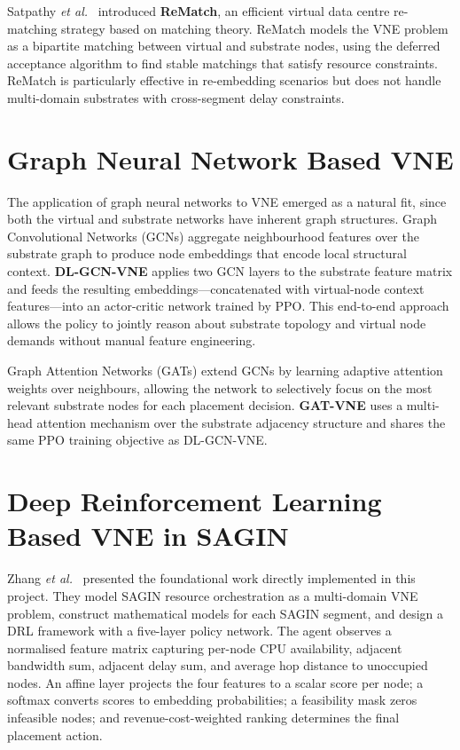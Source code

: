 \documentclass[12pt,a4paper]{report}
\begin{document}
Satpathy \textit{et al.}\ \cite{satpathy2022rematch} introduced \textbf{ReMatch}, an efficient
virtual data centre re-matching strategy based on matching theory. ReMatch models the VNE
problem as a bipartite matching between virtual and substrate nodes, using the deferred
acceptance algorithm to find stable matchings that satisfy resource constraints. ReMatch is
particularly effective in re-embedding scenarios but does not handle multi-domain substrates
with cross-segment delay constraints.

\section{Graph Neural Network Based VNE}

The application of graph neural networks to VNE emerged as a natural fit, since both the
virtual and substrate networks have inherent graph structures. Graph Convolutional Networks
(GCNs) \cite{kipf2017gcn} aggregate neighbourhood features over the substrate graph to produce
node embeddings that encode local structural context. \textbf{DL-GCN-VNE} applies two GCN
layers to the substrate feature matrix and feeds the resulting embeddings---concatenated with
virtual-node context features---into an actor-critic network trained by PPO. This end-to-end
approach allows the policy to jointly reason about substrate topology and virtual node demands
without manual feature engineering.

Graph Attention Networks (GATs) \cite{velickovic2018gat} extend GCNs by learning adaptive
attention weights over neighbours, allowing the network to selectively focus on the most
relevant substrate nodes for each placement decision. \textbf{GAT-VNE} uses a multi-head
attention mechanism over the substrate adjacency structure and shares the same PPO training
objective as DL-GCN-VNE.

\section{Deep Reinforcement Learning Based VNE in SAGIN}

Zhang \textit{et al.}\ \cite{zhang2022drl} presented the foundational work directly
implemented in this project. They model SAGIN resource orchestration as a multi-domain VNE
problem, construct mathematical models for each SAGIN segment, and design a DRL framework with
a five-layer policy network. The agent observes a normalised feature matrix capturing per-node
CPU availability, adjacent bandwidth sum, adjacent delay sum, and average hop distance to
unoccupied nodes. An affine layer projects the four features to a scalar score per node; a
softmax converts scores to embedding probabilities; a feasibility mask zeros infeasible nodes;
and revenue-cost-weighted ranking determines the final placement action.
\end{document}

